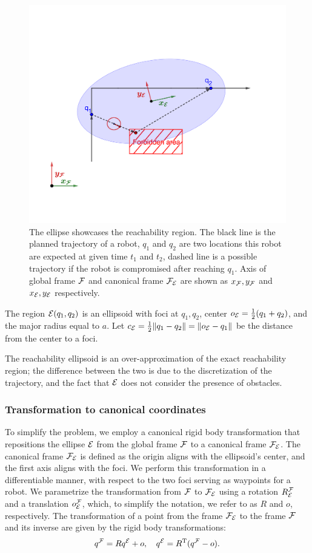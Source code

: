 \documentclass[journal]{IEEEtran}  %
\begin{document}
 \begin{figure}
    \centering
    \includegraphics[width=0.8\linewidth, trim = 2cm 2.5cm 2cm 5cm]{Reachability}
    \caption{The ellipse showcases the reachability region. The black line is the planned trajectory of a robot, $q_1$ and $q_2$ are two locations this robot are expected at given time $t_1$ and $t_2$, dashed line is a possible trajectory if the robot is compromised after reaching $q_1$. Axis of global frame $\mathcal{F}$ and canonical frame $\mathcal{F}_{\mathcal{E}}$ are shown as $x_{\mathcal{F}}, y_{\mathcal{F}}$ and $x_{\mathcal{E}}, y_{\mathcal{E}}$ respectively. }
    \label{fig:EllipseConstraintExample}
  \end{figure}
 

The region $\mathcal{E}(q_1,q_2)$ is an ellipsoid with foci at $q_1,q_2$, center $o_{\mathcal{E}} = \frac{1}{2}(q_1+q_2)$, and the major radius equal to $a$. Let $c_{\mathcal{E}}=\frac{1}{2}\lVert q_1-q_2\rVert=\lVert o_{\mathcal{E}}-q_1\rVert$ be the distance from the center to a foci.

The reachability ellipsoid is an over-approximation of the exact reachability region; the difference between the two is due to the discretization of the trajectory, and the fact that $\mathcal{E}$ does not consider the presence of obstacles.

\subsubsection{Transformation to canonical coordinates}\label{sec:rotation2Standard}
To simplify the problem, we employ a canonical rigid body transformation that repositions the ellipse $\mathcal{E}$ from the global frame $\mathcal{F}$ to a canonical frame $\mathcal{F}_{\mathcal{E}}$. 
The canonical frame $\mathcal{F}_{\mathcal{E}}$ is defined as the origin aligns with the ellipsoid's center, and the first axis aligns with the foci. We perform this transformation in a differentiable manner, with respect to the two foci serving as waypoints for a robot.
We parametrize the transformation from $\mathcal{F}$ to $\mathcal{F}_{\mathcal{E}}$ using a rotation $R^{\mathcal{F}}_{\mathcal{E}}$ and a translation $o^{\mathcal{F}}_{\mathcal{E}}$, which, to simplify the notation, we refer to as $R$ and $o$, respectively. 
The transformation of a point from the frame $\mathcal{F}_{\mathcal{E}}$ to the frame $\mathcal{F}$ and its inverse are given by the rigid body transformations:
  \begin{equation}\label{eq:transformations}
    {q^{\mathcal{F}}}=R{q^{\mathcal{E}}}+o,\quad
    {q^{\mathcal{E}}}=R^\mathrm{T}({q^{\mathcal{F}}}-o).
  \end{equation}
 
\end{document}
